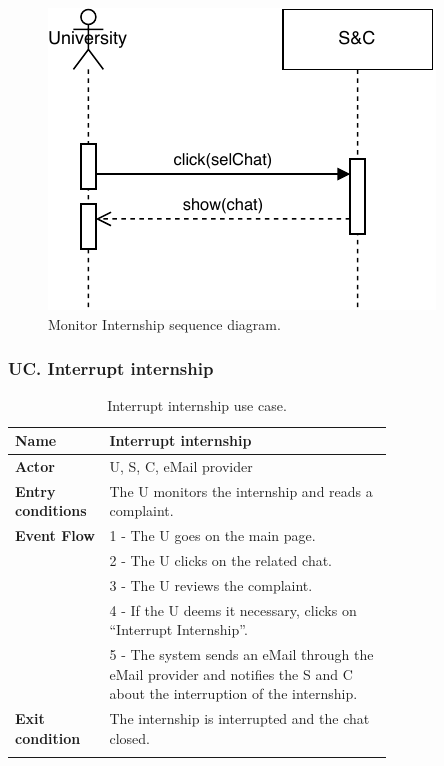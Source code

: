 \begin{figure}[H]
    \begin{center}
        \includegraphics[width=\linewidth]{Images/SequenceDiagram/MonitorInternSD.pdf}
        \caption{Monitor Internship sequence diagram.}
        \label{fig:monitor_intern_seqdiag}%
    \end{center}
\end{figure}


\subsubsection*{UC\cuc . Interrupt internship}
\begin{center}
    \begin{longtable}{|l|p{0.75\linewidth}|}
        \hline
        \textbf{Name}               & Interrupt internship\\
        \hline
        \textbf{Actor}              & U, S, C, eMail provider\\
        \hline
        \textbf{Entry conditions}   & The U monitors the internship and reads a complaint.\\
        \hline
        \textbf{Event Flow}         & 1 - The U goes on the main page. \\
        & 2 - The U clicks on the related chat. \\
        & 3 - The U reviews the complaint. \\
        & 4 - If the U deems it necessary, clicks on “Interrupt Internship”. \\
        & 5 - The system sends an eMail through the eMail provider and notifies the S and C about the interruption of the internship. \\
        \hline
        \textbf{Exit condition}   & The internship is interrupted and the chat closed. \\       
        \hline
        \caption{Interrupt internship use case.}
        \label{tab: interrupt_internship_use_case}
    \end{longtable}
\end{center}


